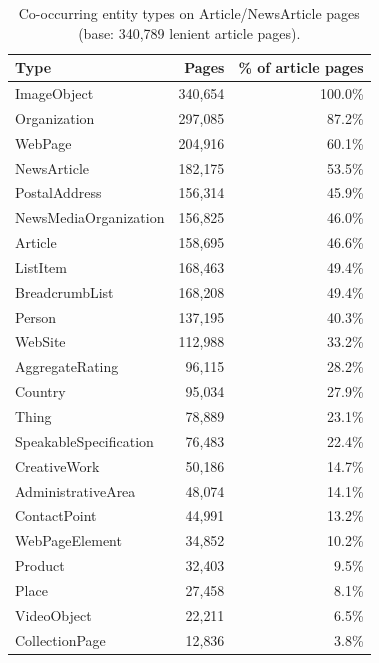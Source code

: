 \documentclass[11pt,a4paper]{article}
\begin{document}
\begin{table}[H]
\centering
\caption{Co-occurring entity types on Article/NewsArticle pages
(base: 340{,}789 lenient article pages).}
\label{tab:cooccur}
\begin{tabular}{lrr}
\toprule
\textbf{Type} & \textbf{Pages} & \textbf{\% of article pages} \\
\midrule
ImageObject              & 340{,}654 & 100.0\% \\
Organization             & 297{,}085 &  87.2\% \\
WebPage                  & 204{,}916 &  60.1\% \\
NewsArticle              & 182{,}175 &  53.5\% \\
PostalAddress            & 156{,}314 &  45.9\% \\
NewsMediaOrganization    & 156{,}825 &  46.0\% \\
Article                  & 158{,}695 &  46.6\% \\
ListItem                 & 168{,}463 &  49.4\% \\
BreadcrumbList           & 168{,}208 &  49.4\% \\
Person                   & 137{,}195 &  40.3\% \\
WebSite                  & 112{,}988 &  33.2\% \\
AggregateRating          &  96{,}115 &  28.2\% \\
Country                  &  95{,}034 &  27.9\% \\
Thing                    &  78{,}889 &  23.1\% \\
SpeakableSpecification   &  76{,}483 &  22.4\% \\
CreativeWork             &  50{,}186 &  14.7\% \\
AdministrativeArea       &  48{,}074 &  14.1\% \\
ContactPoint             &  44{,}991 &  13.2\% \\
WebPageElement           &  34{,}852 &  10.2\% \\
Product                  &  32{,}403 &   9.5\% \\
Place                    &  27{,}458 &   8.1\% \\
VideoObject              &  22{,}211 &   6.5\% \\
CollectionPage           &  12{,}836 &   3.8\% \\
\bottomrule
\end{tabular}
\end{table}
\end{document}
